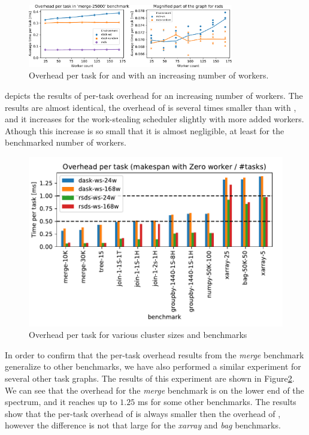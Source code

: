 \begin{figure}
	\centering
	\includegraphics[width=0.8\textwidth]{./imgs/rsds/charts/rsds-merge-worker-scaling}
	\caption{Overhead per task for \rsds{} and \dask{} with an
	increasing number of workers.}
	\label{fig:rsds-merge-worker-scaling}
\end{figure}

 depicts the results of per-task overhead for an increasing
number of workers. The results are almost identical, the overhead of \rsds{} is
several times smaller than with \dask{}, and it increases for the work-stealing
scheduler slightly with more added workers. Athough this increase is so small that it is almost
negligible, at least for the benchmarked number of workers.

\begin{figure}
	\centering
	\includegraphics[width=0.8\columnwidth]{./imgs/rsds/charts/rsds-dask-overhead-all}
	\caption{Overhead per task for various cluster sizes and benchmarks}
	\label{fig:rsds-dask-overhead-all}
\end{figure}

In order to confirm that the per-task overhead results from the \emph{merge}
benchmark generalize to other benchmarks, we have also performed a similar experiment for several
other task graphs. The results of this experiment are shown in Figure\ref{fig:rsds-dask-overhead-all}.
We can see that the overhead for the \emph{merge} benchmark is on the lower end of
the spectrum, and it reaches up to $1.25$ ms for some other benchmarks. The
results show that the per-task overhead of \rsds{} is always smaller then the
overhead of \dask{}, however the difference is not that large for the
\emph{xarray} and \emph{bag} benchmarks.


